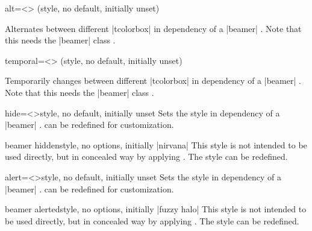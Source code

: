 \begin{docTcbKey}[][doc new={2025-05-25}]{alt}{=\textless{}\textgreater{}}{}
\hfill (style, no default, initially unset)

Alternates between different |tcolorbox|  in dependency of a |beamer| .
Note that this needs the |beamer| class \cite{tantau:beamer}.
\end{docTcbKey}

\begin{docTcbKey}[][doc new={2025-05-25}]{temporal}{=\textless{}\textgreater{}}{}
\hfill (style, no default, initially unset)

Temporarily changes between different |tcolorbox|  in dependency of a |beamer| .
Note that this needs the |beamer| class \cite{tantau:beamer}.
\end{docTcbKey}

\begin{docTcbKey}[][doc new={2019-03-01}]{hide}{=\textless{}\textgreater}{style, no default, initially unset}
Sets the  style in dependency of
a |beamer| .
 can be redefined for customization.
\end{docTcbKey}

\begin{docTcbKey}[][doc new={2019-03-01}]{beamer hidden}{}{style, no options, initially |nirvana|}
This style is not intended to be used directly, but in concealed way by applying
. The style can be redefined.
\begin{dispListing}
\end{dispListing}
\end{docTcbKey}

\begin{docTcbKey}[][doc new={2019-03-01}]{alert}{=\textless{}\textgreater}{style, no default, initially unset}
Sets the  style in dependency of
a |beamer| .
 can be redefined for customization.
\end{docTcbKey}


\begin{docTcbKey}[][doc new={2019-03-01}]{beamer alerted}{}{style, no options, initially |fuzzy halo|}
This style is not intended to be used directly, but in concealed way by applying
. The style can be redefined.
\begin{dispListing}
\end{dispListing}
\end{docTcbKey}


